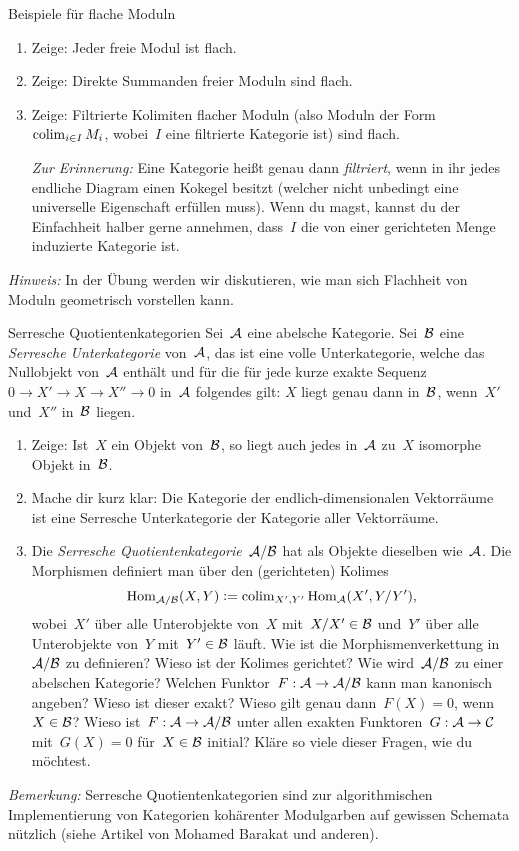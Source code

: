 \documentclass{uebblatt}
\begin{document}
\begin{aufgabe}{Beispiele für flache Moduln}
\begin{enumerate}
\item Zeige: Jeder freie Modul ist flach.
\item Zeige: Direkte Summanden freier Moduln sind flach.
\item Zeige: Filtrierte Kolimiten flacher Moduln (also Moduln der
Form~$\operatorname{colim}_{i \in I} M_i$, wobei~$I$ eine filtrierte Kategorie ist) sind flach.

{\tiny\emph{Zur Erinnerung:} Eine Kategorie heißt genau dann \emph{filtriert}, wenn in
ihr jedes endliche Diagram einen Kokegel besitzt (welcher nicht unbedingt eine
universelle Eigenschaft erfüllen muss). Wenn du magst, kannst du der
Einfachheit halber gerne annehmen, dass~$I$ die von einer gerichteten Menge
induzierte Kategorie ist.\par}
\end{enumerate}
{\tiny\emph{Hinweis:} In der Übung werden wir diskutieren, wie man sich Flachheit von
Moduln geometrisch vorstellen kann.\par}
\end{aufgabe}

\newpage

\begin{aufgabe}{Serresche Quotientenkategorien}
Sei~$\mathcal{A}$ eine abelsche Kategorie. Sei~$\mathcal{B}$ eine \emph{Serresche Unterkategorie}
von~$\mathcal{A}$, das ist eine volle Unterkategorie, welche das Nullobjekt von~$\mathcal{A}$
enthält und für die für jede kurze exakte Sequenz~$0 \to X' \to X \to X'' \to 0$
in~$\mathcal{A}$ folgendes gilt: $X$ liegt genau dann in~$\mathcal{B}$, wenn~$X'$ und~$X''$
in~$\mathcal{B}$ liegen.
\begin{enumerate}
\item Zeige: Ist~$X$ ein Objekt von~$\mathcal{B}$, so liegt auch jedes in~$\mathcal{A}$ zu~$X$ isomorphe
Objekt in~$\mathcal{B}$.
\item Mache dir kurz klar: Die Kategorie der endlich-dimensionalen
Vektorräume ist eine Serresche Unterkategorie der Kategorie aller Vektorräume.
\item Die \emph{Serresche Quotientenkategorie}~$\mathcal{A}/\mathcal{B}$ hat als Objekte
dieselben wie~$\mathcal{A}$. Die Morphismen definiert man über den (gerichteten) Kolimes
\[ \mathrm{Hom}_{\mathcal{A}/\mathcal{B}}(X,Y) \vcentcolon= \operatorname{colim}_{X',Y'} \mathrm{Hom}_{\mathcal{A}}(X', Y/Y'), \]
wobei~$X'$ über alle Unterobjekte von~$X$ mit~$X/X' \in \mathcal{B}$ und~$Y'$ über alle
Unterobjekte von~$Y$ mit~$Y' \in \mathcal{B}$ läuft. Wie ist die Morphismenverkettung
in~$\mathcal{A}/\mathcal{B}$ zu definieren? Wieso ist der Kolimes gerichtet? Wie wird~$\mathcal{A}/\mathcal{B}$ zu einer abelschen Kategorie?
Welchen Funktor~$F : \mathcal{A} \to \mathcal{A}/\mathcal{B}$ kann man kanonisch angeben? Wieso ist dieser
exakt? Wieso gilt genau dann~$F(X) = 0$, wenn~$X \in \mathcal{B}$? Wieso ist~$F : \mathcal{A} \to
\mathcal{A}/\mathcal{B}$ unter allen exakten Funktoren~$G : \mathcal{A} \to \mathcal{C}$ mit~$G(X) = 0$ für~$X \in \mathcal{B}$
initial? Kläre so viele dieser Fragen, wie du möchtest.
\end{enumerate}
{\tiny\emph{Bemerkung:} Serresche Quotientenkategorien sind zur algorithmischen
Implementierung von Kategorien kohärenter Modulgarben auf gewissen Schemata
nützlich (siehe Artikel von Mohamed Barakat und anderen).\par}
\end{aufgabe}
\end{document}
